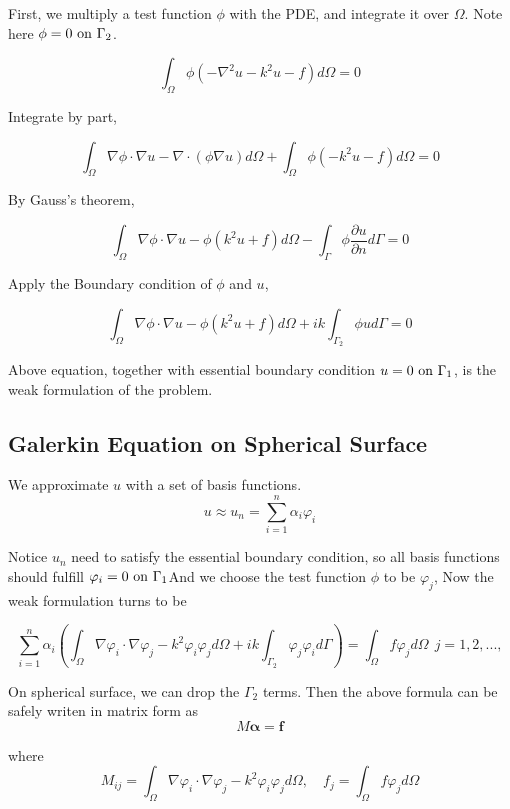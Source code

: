\documentclass[a4paper]{article}
\renewcommand{\vec}[1]{\mathbf{#1}}
\begin{document}
First, we multiply a test function $\phi$ with the PDE, and integrate it over $\Omega$. Note here $\phi = 0 \rm \ on \ \Gamma_{2}$.

\[ \int_\Omega \phi (-\nabla^{2} u - k^{2} u - f) d\Omega = 0 \]

Integrate by part,

\[ \int_\Omega \nabla \phi \cdot \nabla u - \nabla \cdot (\phi \nabla u) d\Omega + \int_\Omega \phi ( - k^{2} u - f) d\Omega = 0 \]

By Gauss's theorem,

\[ \int_\Omega \nabla \phi \cdot \nabla u -\phi (  k^{2} u + f) d\Omega - \int_\Gamma \phi \frac{\partial u}{\partial n} d\Gamma = 0 \] 

Apply the Boundary condition of $\phi$ and $u$,

\[ \int_\Omega \nabla \phi \cdot \nabla u -\phi (  k^{2} u + f) d\Omega + ik\int_{\Gamma_{2}} \phi u d\Gamma = 0 \] 

Above equation, together with essential boundary condition $u = 0 \rm \ on \  \Gamma_{1}$, is the weak formulation of the problem.


\subsection{Galerkin Equation on Spherical Surface}

We approximate $u$ with a set of basis functions.
\[ u \approx u_{n} = \sum_{i=1}^{n} \alpha_{i} \varphi_{i} \]

Notice $u_{n}$ need to satisfy the essential boundary condition, so all basis functions should fulfill $\varphi_{i}=0 \ \rm on \  \Gamma_{1} $And we choose the test function $\phi $ to be $\varphi_{j}$, Now the weak formulation turns to be


\[ \sum_{i=1}^{n}\alpha_{i}( \int_\Omega \nabla \varphi_{i} \cdot \nabla \varphi_{j} -k^{2}\varphi_{i} \varphi_{j}  d\Omega + ik\int_{\Gamma_{2}} \varphi_{j} \varphi_{i} d\Gamma) = \int_{\Omega}f\varphi_{j}d\Omega \ \ j= 1, 2,..., \] 





On spherical surface, we can drop the $\Gamma_2$ terms. Then the above formula can be safely writen in matrix form as 
\[    
M \vec{\alpha}=\vec{f}
\]

where \[
M_{ij}=\int_\Omega \nabla \varphi_{i} \cdot \nabla \varphi_{j} -k^{2}\varphi_{i} \varphi_{j}  d\Omega,\quad f_j= \int_{\Omega}f\varphi_{j}d\Omega
\]
\end{document}
